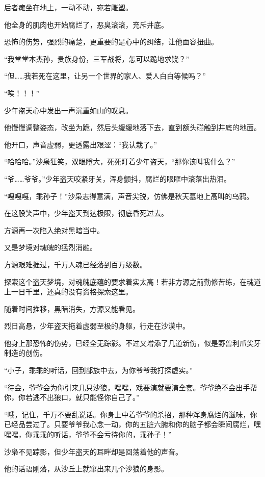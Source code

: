 \begin{this_body}
后者瘫坐在地上，一动不动，宛若雕塑。

他全身的肌肉也开始腐烂了，恶臭滚滚，充斥井底。

恐怖的伤势，强烈的痛楚，更重要的是心中的纠结，让他面容扭曲。

“我堂堂本杰孙，贵族身份，三军战将，怎可以跪地求饶？”

“但……我若死在这里，让另一个世界的家人、爱人白白等候吗？”

“唉！！！”

少年盗天心中发出一声沉重如山的叹息。

他慢慢调整姿态，改坐为跪，然后头缓缓地落下去，直到额头碰触到井底的地面。

他开口，声音虚弱，更透露出艰涩：“我认栽了。”

“哈哈哈。”沙枭狂笑，双眼瞪大，死死盯着少年盗天，“那你该叫我什么？”

“爷……爷爷。”少年盗天咬紧牙关，浑身颤抖，腐烂的眼眶中滚落出热泪。

“嘎嘎嘎，乖孙子！”沙枭志得意满，声音尖锐，仿佛是秋天墓地上高叫的乌鸦。

在这股笑声中，少年盗天到达极限，彻底昏死过去。

方源再一次陷入绝对黑暗当中。

又是梦境对魂魄的猛烈消融。

方源艰难捱过，千万人魂已经落到百万级数。

探索这个盗天梦境，对魂魄底蕴的要求着实太高！若非方源之前勤修苦练，在魂道上一日千里，还真的没有资格探索这里。

随着时间推移，黑暗消失，方源又能看见。

烈日高悬，少年盗天拖着虚弱至极的身躯，行走在沙漠中。

他身上那恐怖的伤势，已经全无踪影。不过又增添了几道新伤，似是野兽利爪尖牙制造的创伤。

“小子，乖乖的听话，回到部族中去，为你爷爷我打探虚实。”

“待会，爷爷会为你引来几只沙狼，嘿嘿，戏要演就要演全套。爷爷绝不会出手帮你，你若逃不出狼口，就只能怪你自己了。”

“哦，记住，千万不要乱说话。你身上中着爷爷的杀招，那种浑身腐烂的滋味，你已经品尝过了。只要爷爷我心念一动，你的五脏六腑和你的脑子都会瞬间腐烂，嘿嘿嘿，你乖乖的听话，爷爷不会亏待你的，乖孙子！”

沙枭不见踪影，但少年盗天的耳畔却是回荡着他的声音。

他的话语刚落，从沙丘上就窜出来几个沙狼的身影。


\end{this_body}
